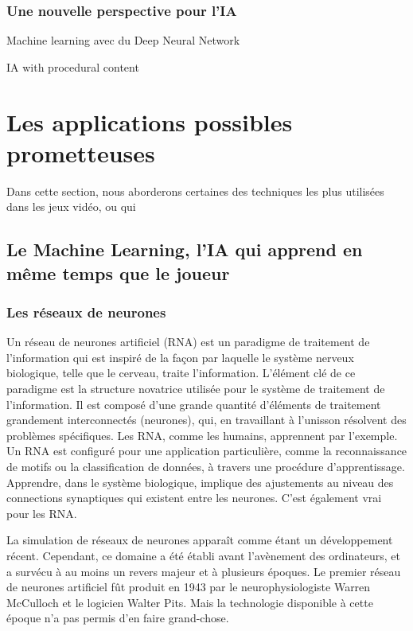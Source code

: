 \documentclass[a4paper, 12pt]{article} %
\begin{document}
\newpage
\subsubsection{Une nouvelle perspective pour l’IA}

Machine learning avec du Deep Neural Network

IA with procedural content

\newpage
\section{Les applications possibles prometteuses}

Dans cette section, nous aborderons certaines des techniques les plus utilisées dans les jeux vidéo, ou qui 

\subsection{Le Machine Learning, l’IA qui apprend en même temps que le joueur}

\subsubsection{Les réseaux de neurones}

Un réseau de neurones artificiel (RNA) est un paradigme de traitement de l’information qui est inspiré de la façon par laquelle le système nerveux biologique, telle que le cerveau, traite l’information. L’élément clé de ce paradigme est la structure novatrice utilisée pour le système de traitement de l’information. Il est composé d’une grande quantité d’éléments de traitement grandement interconnectés (neurones), qui, en travaillant à l’unisson résolvent des problèmes spécifiques. Les RNA, comme les humains, apprennent par l’exemple. Un RNA est configuré pour une application particulière, comme la reconnaissance de motifs ou la classification de données, à travers une procédure d’apprentissage. Apprendre, dans le système biologique, implique des ajustements au niveau des connections synaptiques qui existent entre les neurones. C’est également vrai pour les RNA.

La simulation de réseaux de neurones apparaît comme étant un développement récent. Cependant, ce domaine a été établi avant l’avènement des ordinateurs, et a survécu à au moins un revers majeur et à plusieurs époques. Le premier réseau de neurones artificiel fût produit en 1943 par le neurophysiologiste Warren McCulloch et le logicien Walter Pits. Mais la technologie disponible à cette époque n’a pas permis d’en faire grand-chose.
\end{document}

